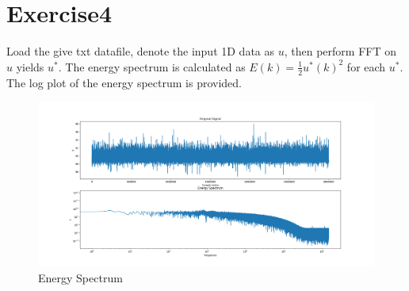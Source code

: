 \documentclass[paper=a4, fontsize=11pt]{scrartcl} %
\numberwithin{equation}{section} %
\numberwithin{figure}{section} %
\numberwithin{table}{section} %
\begin{document}
\section{Exercise4}
	Load the give txt datafile, denote the input 1D data as $u$, then perform FFT on $u$ yields $u^*$. The energy spectrum is calculated as
	$E(k) = \frac{1}{2} u^*(k)^2$ for each $u^*$. The log plot of the energy spectrum is provided.
	\begin{figure}[]
		\centering
		\includegraphics[angle=90, width=12cm]{EnergySpectrum.png}
		\caption{Energy Spectrum}
		\label{img:es}
	\end{figure}
\end{document}
